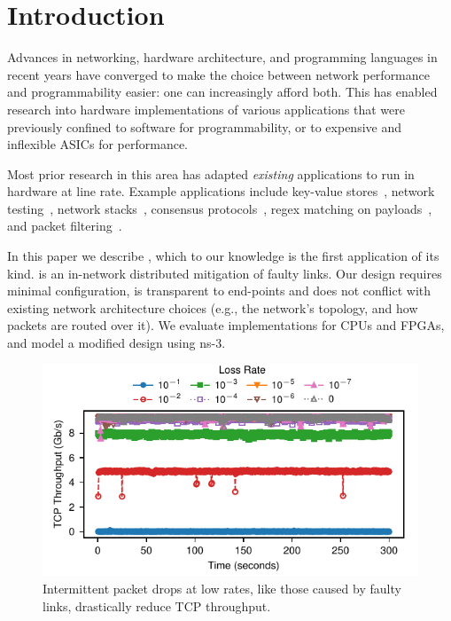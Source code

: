 \section{Introduction}
Advances in networking, hardware architecture, and programming
languages in recent years have converged to make the choice between
network performance and programmability easier: one can increasingly
afford both.
This has enabled research into hardware implementations of various
applications that were previously confined to software for
programmability, or to expensive and inflexible ASICs for performance.

Most prior research in this area has adapted \emph{existing}
applications to run in hardware at line rate.
Example applications include
key-value stores~\cite{Li:2017:KHI:3132747.3132756},
network testing~\cite{Shahbaz:2013:AOS:2537857.2537880},
network stacks~\cite{Istvan:2016:CBI:2930611.2930639},
consensus protocols~\cite{Istvan:2016:CBI:2930611.2930639},
regex matching on payloads~\cite{Woods:2010:CED:1920841.1920926},
and packet filtering~\cite{Fiessler:2016:HVH:2881025.2881033}.

In this paper we describe \OurSys, which to our knowledge is the first application
of its kind. \OurSys is an in-network distributed
mitigation of faulty links.
Our design requires
minimal configuration, is transparent to
end-points and does not conflict
with existing network architecture choices (e.g., the network's topology,
and how packets are routed over it).
We evaluate implementations for CPUs and FPGAs, and model a modified
design using ns-3.


\begin{figure}
  \centering
  \includegraphics[width=0.3\paperwidth]{figures/timeVsTput.pdf}
  \caption{\label{fig:timeVsTput} Intermittent packet drops at low rates, like those 
  caused by faulty links, drastically reduce TCP throughput.}
\end{figure}


